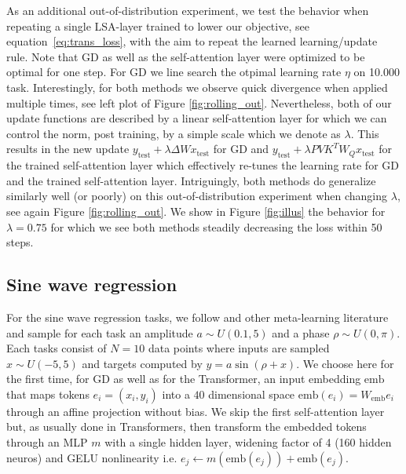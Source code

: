\documentclass{article}
\def\eqref#1{equation~\ref{#1}}
\theoremstyle{plain}
\theoremstyle{definition}
\theoremstyle{remark}
\begin{document}
As an additional out-of-distribution experiment, we test the behavior when repeating a single LSA-layer trained to lower our objective, see \eqref{eq:trans_loss}, with the aim to repeat the learned learning/update rule. Note that GD as well as the self-attention layer were optimized to be optimal for one step. For GD we line search the otpimal learning rate $\eta$ on 10.000 task.
Interestingly, for both methods we observe quick divergence when applied multiple times, see left plot of Figure \ref{fig:rolling_out}. Nevertheless, both of our update functions are described by a linear self-attention layer for which we can control the norm, post training, by a simple scale which we denote as $\lambda$. This results in the new update $y_{\text{test}} + \lambda \Delta Wx_{\text{test}}$ for GD and $y_{\text{test}} + \lambda PVK^TW_Qx_{\text{test}}$ for the trained self-attention layer which effectively re-tunes the learning rate for GD and the trained self-attention layer. Intriguingly, both methods do generalize similarly well (or poorly) on this out-of-distribution experiment when changing $\lambda$, see again Figure \ref{fig:rolling_out}. We show in Figure \ref{fig:illus} the behavior for $\lambda=0.75$ for which we see both methods steadily decreasing the loss within 50 steps. 

\subsection{Sine wave regression}
\label{app:non_linear}

For the sine wave regression tasks, we follow \cite{finn_model-agnostic_2017} and other meta-learning literature and sample for each task an amplitude $a \sim U(0.1, 5)$ and a phase $\rho \sim U(0, \pi)$. Each tasks consist of $N=10$ data points where inputs are sampled $x \sim U(-5, 5)$ and targets computed by $y = a \sin(\rho + x)$.
We choose here for the first time, for GD as well as for the Transformer, an input embedding $\text{emb}$ that maps tokens $e_i = (x_i, y_i)$ into a $40$ dimensional space $\text{emb}(e_i) =  W_{\text{emb}}e_i$ through an affine projection without bias. We skip the first self-attention layer but, as usually done in Transformers, then transform the embedded tokens through an MLP $m$ with a single hidden layer, widening factor of 4 (160 hidden neuros) and GELU nonlinearity \citep{gelu} i.e. $e_j \leftarrow m(\text{emb}(e_j)) + \text{emb}(e_j)$. 
\end{document}
